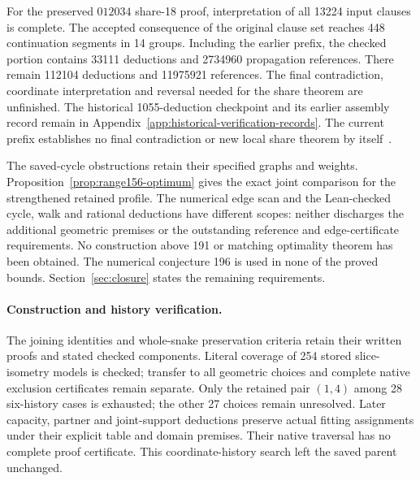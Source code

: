 \documentclass[11pt,a4paper]{article}
\theoremstyle{definition}
\theoremstyle{remark}
\begin{document}
For the preserved $012034$ share-18 proof, interpretation of all 13224
input clauses is complete. The accepted consequence of the original
clause set reaches 448 continuation segments in 14 groups. Including
the earlier prefix, the checked portion contains 33111 deductions and
2734960 propagation references. There remain 112104 deductions and
11975921 references. The final contradiction, coordinate interpretation
and reversal needed for the share theorem are unfinished. The historical
1055-deduction checkpoint and its earlier assembly record remain in
Appendix~\ref{app:historical-verification-records}. The current prefix
establishes no final contradiction or new local share theorem
by itself~\cite{replay165archive}.

The saved-cycle obstructions retain their specified graphs and weights.
Proposition~\ref{prop:range156-optimum} gives the exact joint comparison
for the strengthened retained profile. The numerical edge scan and the
Lean-checked cycle, walk and rational deductions have different scopes:
neither discharges the additional geometric premises or the outstanding
reference and edge-certificate requirements. No construction above 191 or
matching optimality theorem has been obtained. The numerical conjecture
196 is used in none of the proved bounds. Section~\ref{sec:closure} states
the remaining requirements.

\paragraph{Construction and history verification.}
The joining identities and whole-snake preservation criteria retain
their written proofs and stated checked components. Literal coverage of
254 stored slice-isometry models is checked; transfer to all geometric
choices and complete native exclusion certificates remain separate.
Only the retained pair $(1,4)$ among 28 six-history cases is exhausted;
the other 27 choices remain unresolved. Later capacity, partner and
joint-support deductions preserve actual fitting assignments under
their explicit table and domain premises. Their native traversal has
no complete proof certificate. This coordinate-history search left
the saved parent unchanged.
\end{document}
